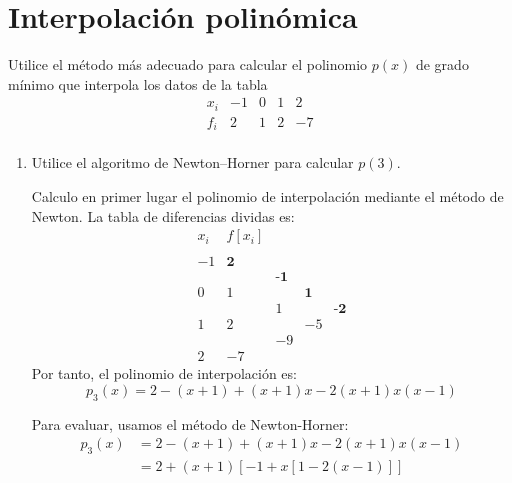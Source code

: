 \section{Interpolación polinómica}\label{sec:Rel3.1}

\begin{ejercicio}
    Utilice el método más adecuado para calcular el polinomio $p(x)$ de grado mínimo que interpola los datos de la tabla
    \begin{equation*}
        \begin{array}{c|ccccc}
            x_i & -1 & 0 & 1 & 2 \\ \hline
            f_i & 2 & 1 & 2 & -7 \\
        \end{array}
    \end{equation*}

    \begin{enumerate}
        \item Utilice el algoritmo de Newton–Horner para calcular $p(3)$.

        Calculo en primer lugar el polinomio de interpolación mediante el método de Newton. La tabla de diferencias dividas es:
        \begin{equation*}
            \begin{array}{c|cccc}
                x_i & f[x_i] \\
                \\
                -1 & \textbf{2} \\
                && \textbf{-1}\\
                0 & 1 & & \textbf{1}\\
                && 1 &&\textbf{-2}\\
                1 & 2 && -5\\
                & & -9\\
                2 &-7
            \end{array}
        \end{equation*}
        Por tanto, el polinomio de interpolación es:
        \begin{equation*}
            p_3(x) = 2-(x+1) +(x+1)x -2(x+1)x(x-1)
        \end{equation*}

        Para evaluar, usamos el método de Newton-Horner:
        \begin{equation*}
            \begin{split}
                p_3(x) &= 2-(x+1) +(x+1)x -2(x+1)x(x-1) \\
                &= 2+(x+1)[-1+x[1-2(x-1)]]
            \end{split}
        \end{equation*}


\end{enumerate}
\end{ejercicio}
